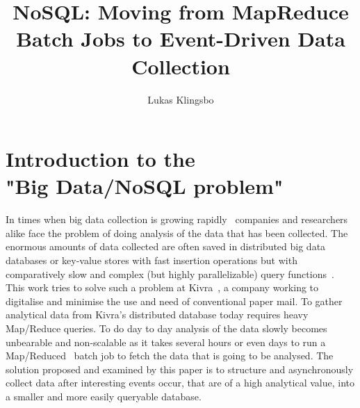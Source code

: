 \documentclass[a4paper,12pt]{article}
\title{\textbf{NoSQL: Moving from MapReduce Batch Jobs to Event-Driven Data Collection}}
\author{Lukas Klingsbo}
\providecommand{\keywords}[1]{\textbf{\textit{Keywords: }} #1}
\begin{document}

\thispagestyle{empty}
\newpage\null\thispagestyle{empty}\newpage

\setcounter{page}{2}


%
%
%

\newpage\null\thispagestyle{empty}\newpage

\setcounter{tocdepth}{3}
\tableofcontents

\clearpage
{}
\setcounter{page}{1}
\section{Introduction to the\\"Big Data/NoSQL problem"}
In times when big data collection is growing rapidly~\cite{E1} companies and researchers alike face the problem of doing analysis of the data that has been collected.
The enormous amounts of data collected are often saved in distributed big data databases or key-value stores with fast insertion operations but with comparatively slow and complex (but highly parallelizable) query functions~\cite{RT1}.
This work tries to solve such a problem at Kivra~\cite{KIVRA}, a company working to digitalise and minimise the use and need of conventional paper mail. To gather analytical data from Kivra's distributed database today requires heavy Map/Reduce 
queries. To do day to day analysis of the data slowly becomes unbearable and non-scalable as it takes several hours or even days to run a Map/Reduced~\cite{G1} batch job to fetch the data that is going to be analysed.
The solution proposed and examined by this paper is to structure and asynchronously collect data after interesting events occur, that are of a high analytical value, into a smaller and more easily queryable database.
\end{document}
